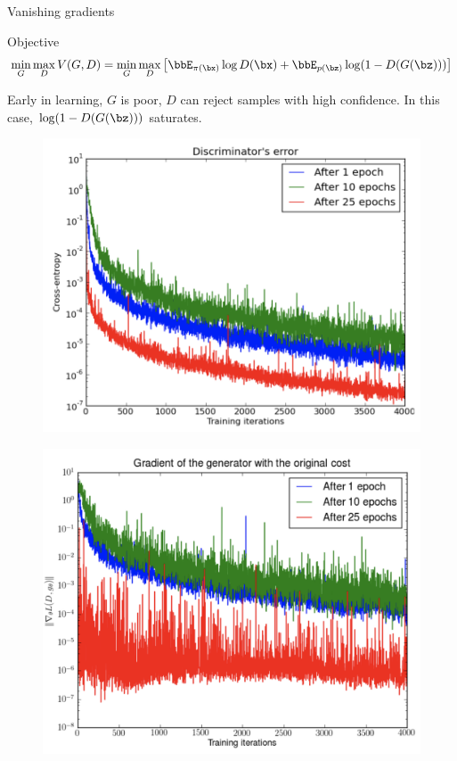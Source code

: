 \begin{frame}{Vanishing gradients}
	\begin{block}{Objective}
		\vspace{-0.4cm}
		\[
		\min_{G} \max_D V(G, D) = \min_{G} \max_D \left[ \bbE_{\pi(\bx)} \log D(\bx) + \bbE_{p(\bz)} \log (1 - D(G(\bz))) \right]
		\]
		\vspace{-0.4cm}
	\end{block}
	Early in learning, $G$ is poor, $D$ can reject samples with high confidence. In this case, $\log (1 - D(G(\bz)))$ saturates.
	\begin{minipage}[t]{0.5\columnwidth}
		\begin{figure}
			\centering
			\includegraphics[width=0.9\linewidth]{figs/vanishing_gradients_1}
		\end{figure}
	\end{minipage}%
	\begin{minipage}[t]{0.5\columnwidth}
		\begin{figure}
			\centering
			\includegraphics[width=0.9\linewidth]{figs/vanishing_gradients_2}
		\end{figure}
	\end{minipage}
\end{frame}
